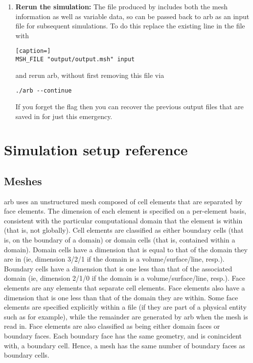\begin{enumerate}
\item  \textbf{Rerun the simulation:}  The  file produced by  includes both the mesh information as well as variable data, so can be passed back to arb as an input  file for subsequent simulations.  To do this replace the existing  line in the  file with
%
\begin{lstlisting}[caption=]
MSH_FILE "output/output.msh" input
\end{lstlisting}
%
and rerun arb, without first removing this file via
%
\begin{verbatim}
./arb --continue
\end{verbatim}
%
If you forget the  flag then you can recover the previous output files that are saved in  for just this emergency.

\end{enumerate}

\pagebreak
\section{Simulation setup reference \label{sec:setup_reference}}


\subsection{Meshes}


arb uses an unstructured mesh composed of cell elements that are separated by face elements.  The dimension of each element is specified on a per-element basis, consistent with the particular computational domain that the element is within (that is, not globally).  Cell elements are classified as either boundary cells (that is, on the boundary of a domain) or domain cells (that is, contained within a domain).  Domain cells have a dimension that is equal to that of the domain they are in (ie, dimension 3/2/1 if the domain is a volume/surface/line, resp.).  Boundary cells have a dimension that is one less than that of the associated domain (ie, dimension 2/1/0 if the domain is a volume/surface/line, resp.).  Face elements are any elements that separate cell elements.  Face elements also have a dimension that is one less than that of the domain they are within.  Some face elements are specified explicitly within a  file (if they are part of a physical entity such as  for example), while the remainder are generated by arb when the mesh is read in.  Face elements are also classified as being either domain faces or boundary faces.  Each boundary face has the same geometry, and is conincident with, a boundary cell.  Hence, a mesh has the same number of boundary faces as boundary cells.

